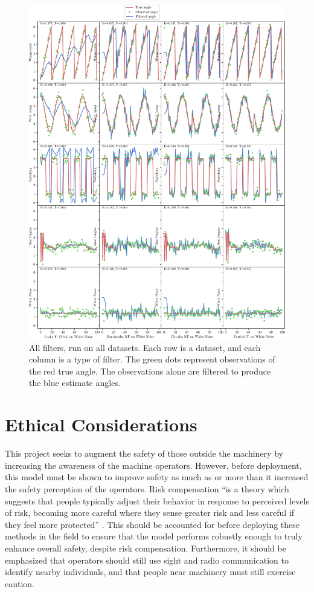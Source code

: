 \documentclass[11pt]{amsart}
\begin{document}
\begin{figure}[htp]
    \centering
    \includegraphics[width=1\textwidth]{actual_paper_graphs/all.pdf}\hfill
    \caption{All filters, run on all datasets. Each row is a dataset, and each column is a type of filter. The green dots represent observations of the red true angle. The observations alone are filtered to produce the blue estimate angles.}
    \label{fig:all_filters}
\end{figure}

\section{Ethical Considerations}
This project seeks to augment the safety of those outside the machinery by increasing the awareness of the machine operators. However, before deployment, this model must be 
shown to improve safety as much as or more than it increased the safety perception of the operators. Risk compensation “is a theory which suggests that people typically adjust 
their behavior in response to perceived levels of risk, becoming more careful where they sense greater risk and less careful if they feel more protected” \cite{Risk}. This should 
be accounted for before deploying these methods in the field to ensure that the model performs robustly enough to truly enhance overall safety, despite risk compensation. Furthermore, 
it should be emphasized that operators should still use sight and radio communication to identify nearby individuals, and that people near machinery must still exercise caution. 
\end{document}
